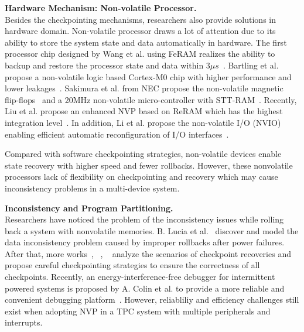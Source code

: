 \noindent\textbf{Hardware Mechanism: Non-volatile Processor.} \\
%
Besides the checkpointing mechanisms, researchers also provide solutions in hardware domain.
Non-volatile processor draws a lot of attention due to its ability to store the system state and data automatically in hardware.
The first processor chip designed by Wang et al. using FeRAM realizes the ability to backup and restore the processor state and data within $3\mu s$~\cite{wang20123us}.
Bartling et al. propose a non-volatile logic based Cortex-M0 chip with higher performance and lower leakages~\cite{Bartling2013An}.
Sakimura et al. from NEC propose the non-volatile magnetic flip-flops~\cite{Sakimura2009Nonvolatile} and a 20MHz non-volatile micro-controller with STT-RAM~\cite{Sakimura201410}.
Recently, Liu et al. propose an enhanced NVP based on ReRAM which has the highest integration level~\cite{liu2016a}.
In addition, Li et al. propose the non-volatile I/O (NVIO) enabling efficient automatic reconfiguration of  I/O interfaces~\cite{li2016hw}.

Compared with software checkpointing strategies, non-volatile devices enable state recovery with higher speed and fewer rollbacks.
However, these nonvolatile processors lack of flexibility on checkpointing and recovery which may cause inconsistency problems in a multi-device system.


\noindent\textbf{Inconsistency and Program Partitioning.} \\
%
Researchers have noticed the problem of the inconsistency issues while rolling back a system with nonvolatile memories.
B. Lucia et al.~\cite{Lucia2015} discover and model the data inconsistency problem caused by improper rollbacks after power failures.
After that, more works~\cite{van2016intermittent}, ~\cite{colin2016chain}, ~\cite{Xie2015} analyze the scenarios of checkpoint recoveries and propose careful checkpointing strategies to ensure the correctness of all checkpoints.
Recently, an energy-interference-free debugger for intermittent powered systems is proposed by A. Colin et al. to provide a more reliable and convenient debugging platform~\cite{Colin2016An}.
However, reliabliliy and efficiency challenges still exist when adopting NVP in a TPC system with multiple peripherals and interrupts.

